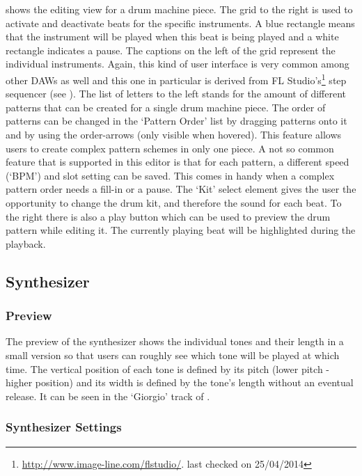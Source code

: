  shows the editing view for a drum machine piece. The grid to the right is used to activate and deactivate beats for the specific instruments. A blue rectangle means that the instrument will be played when this beat is being played and a white rectangle indicates a pause. The captions on the left of the grid represent the individual instruments. Again, this kind of user interface is very common among other DAWs as well and this one in particular is derived from FL Studio's\footnote{\url{http://www.image-line.com/flstudio/}. last checked on 25/04/2014} step sequencer (see ). The list of letters to the left stands for the amount of different patterns that can be created for a single drum machine piece. The order of patterns can be changed in the `Pattern Order' list by dragging patterns onto it and by using the order-arrows (only visible when hovered). This feature allows users to create complex pattern schemes in only one piece. A not so common feature that is supported in this editor is that for each pattern, a different speed (`BPM') and slot setting can be saved. This comes in handy when a complex pattern order needs a fill-in or a pause. The `Kit' select element gives the user the opportunity to change the drum kit, and therefore the sound for each beat. To the right there is also a play button which can be used to preview the drum pattern while editing it. The currently playing beat will be highlighted during the playback.

\subsection{Synthesizer}
\label{concept-synth}

\subsubsection{Preview}
\label{concept-synth-preview}

The preview of the synthesizer shows the individual tones and their length in a small version so that users can roughly see which tone will be played at which time. The vertical position of each tone is defined by its pitch (lower pitch - higher position) and its width is defined by the tone's length without an eventual release. It can be seen in the `Giorgio' track of .

\subsubsection{Synthesizer Settings}
\label{concept-synth-settings}

